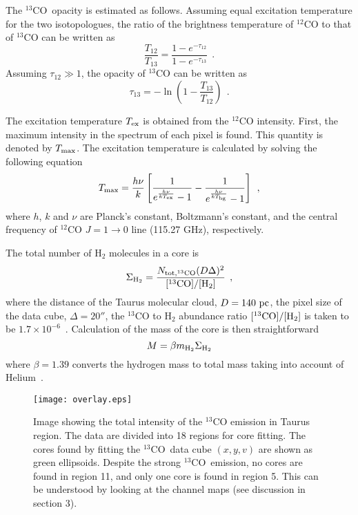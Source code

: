 \documentclass[12pt,preprint]{aastex}
\def\13co{$^{13}$CO}
\def\lp{\>\> .}
\def\lc{\>\> ,}
\begin{document}
The \13co\ opacity is estimated as follows. Assuming equal excitation temperature for the two
isotopologues, the ratio of the brightness temperature of $^{12}$CO to that of $^{13}$CO
can be written as
\begin{equation}
\frac{T_{12}}{T_{13}}=\frac{1-e^{-\tau_{12}}}{1-e^{-\tau_{13}}} \lp
\end{equation}
Assuming $\tau_{12}\gg 1$, the opacity of $^{13}$CO can be written as
\begin{equation}
\tau_{13}=-\ln\left(1-\frac{T_{13}}{T_{12}}\right) \lp
\end{equation}


The excitation temperature $T_{\rm ex}$ is obtained from the $^{12}$CO
intensity. First, the maximum intensity in the spectrum of each
pixel is found. This
quantity is denoted by $T_{\rm max}$. The excitation
temperature is calculated by solving the following equation
\begin{equation}
T_{\rm max}=\frac{h\nu}{k}\left[\frac{1}{e^{\frac{h\nu}{kT_{\rm
ex}}}-1}-\frac{1}{e^{\frac{h\nu}{kT_{\rm bg}}}-1}\right] \lc
\end{equation}
where $h$, $k$ and $\nu$ are Planck's constant, Boltzmann's constant,
and the central frequency of $^{12}$CO $J =1\to 0$ line (115.27 GHz), respectively.

The total number of H$_2$ molecules in a core is
\begin{equation}
\Sigma_{\rm H_2}=\frac{N_{\rm tot, ^{13}CO}(D\Delta)^2}{[^{13}\rm
CO]/[\rm H_2]} \lc
\end{equation}
where the distance of the Taurus molecular cloud, $D=140\ {\rm pc}$, the pixel size of the data cube, $\Delta=20''$,
the $^{13}$CO to H$_2$ abundance ratio $[^{13}\rm
CO]/[\rm H_2]$ is taken to be $1.7\times 10^{-6}$~\citep{CO_H_ratio_2}.
Calculation of the mass of the core is then straightforward
\begin{equation}
M=\beta m_{\rm H_2}\Sigma_{\rm H_2}
\end{equation}
where $\beta =1.39 $  converts the hydrogen mass to total mass taking into account of Helium~\citep{Wilson1994}.



\begin{figure}[htb]
\centering
\texttt{[image: overlay.eps]}
\caption{ Image showing the total intensity of the $^{13}$CO emission
in Taurus region. The data are divided into 18 regions for core
fitting. The cores found by fitting the \13co\ data cube $(x,y,v)$ are shown as green ellipsoids. Despite the strong \13co\ emission, no
cores are found in region 11, and only one core is found in region 5.
This can be understood by looking at the channel maps (see discussion in section 3).
 \label{fig1}}
\end{figure}
\end{document}
